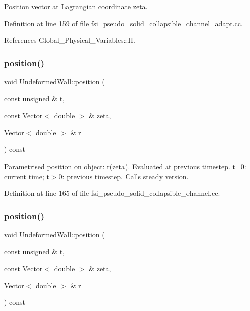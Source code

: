 Position vector at Lagrangian coordinate zeta. 



Definition at line 159 of file fsi\+\_\+pseudo\+\_\+solid\+\_\+collapsible\+\_\+channel\+\_\+adapt.\+cc.



References Global\+\_\+\+Physical\+\_\+\+Variables\+::H.

\mbox{\label{classUndeformedWall_a9cbb52e30fd47d1841c1c3dc812f4b96}} 
\subsubsection{\texorpdfstring{position()}{position()}\hspace{0.1cm}{\footnotesize\ttfamily [7/8]}}
{\footnotesize\ttfamily void Undeformed\+Wall\+::position (\begin{DoxyParamCaption}\item[{const unsigned \&}]{t,  }\item[{const Vector$<$ double $>$ \&}]{zeta,  }\item[{Vector$<$ double $>$ \&}]{r }\end{DoxyParamCaption}) const\hspace{0.3cm}{\ttfamily [inline]}}



Parametrised position on object\+: r(zeta). Evaluated at previous timestep. t=0\+: current time; t$>$0\+: previous timestep. Calls steady version. 



Definition at line 165 of file fsi\+\_\+pseudo\+\_\+solid\+\_\+collapsible\+\_\+channel.\+cc.

\mbox{\label{classUndeformedWall_a9cbb52e30fd47d1841c1c3dc812f4b96}} 
\subsubsection{\texorpdfstring{position()}{position()}\hspace{0.1cm}{\footnotesize\ttfamily [8/8]}}
{\footnotesize\ttfamily void Undeformed\+Wall\+::position (\begin{DoxyParamCaption}\item[{const unsigned \&}]{t,  }\item[{const Vector$<$ double $>$ \&}]{zeta,  }\item[{Vector$<$ double $>$ \&}]{r }\end{DoxyParamCaption}) const\hspace{0.3cm}{\ttfamily [inline]}}



